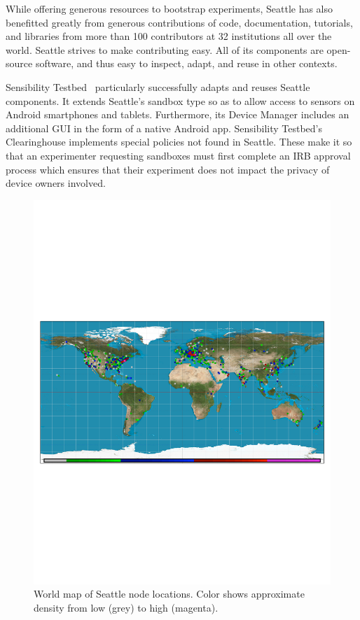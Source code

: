 While offering generous resources to bootstrap experiments,
Seattle has also benefitted greatly from generous contributions
of code, documentation, tutorials, and libraries from more than 100
contributors at 32 institutions all over the world.
Seattle strives to make contributing easy. All of its components
are open-source software, and thus easy to inspect, adapt, and
reuse in other contexts.

Sensibility Testbed~\cite{zhuang2014sensibility} particularly
successfully adapts and reuses Seattle components. It extends
Seattle's sandbox type so as to allow access
to sensors on Android smartphones and tablets. Furthermore, its
Device Manager includes an additional \gls{GUI} in the form of
a native Android app. Sensibility Testbed's Clearinghouse implements
special policies not found in Seattle. These make it so that
an experimenter requesting sandboxes must first complete
an \gls{IRB} approval process which ensures that their experiment
does not impact the privacy of device owners involved.


\begin{figure}
  \centering
  \includegraphics[width=\columnwidth]{figures/finishedmap_ipinfo_small.pdf}
  \caption{World map of Seattle node locations. Color shows approximate density from low (grey) to high (magenta).}
  \label{fig:map}
\end{figure}

